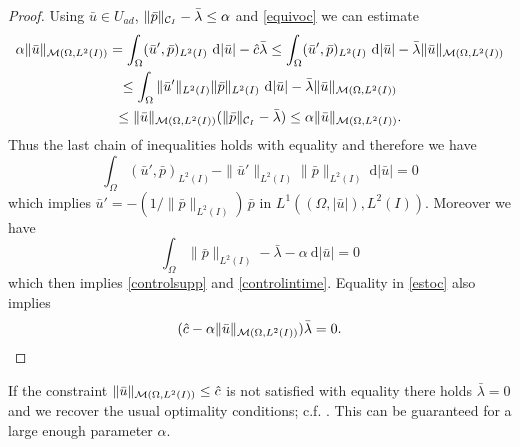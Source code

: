 \begin{proof}
Using $\bar u\in U_{ad}$, $\|\bar p\|_{\mathcal{C}_I}-\bar\lambda\leq\alpha$ and \eqref{equivoc} we can estimate
\begin{multline}\label{estoc}
\alpha\|\bar u\|_{\mathcal{M}(\Omega, L^{2}(I))}=\int_{\Omega}(\bar u',\bar p)_{L^2(I)}~\mathrm d|\bar u|-\hat c\bar\lambda\leq \int_\Omega(\bar u',\bar p)_{L^2(I)}~\mathrm d|\bar u|-\bar\lambda\|\bar u\|_{\mathcal{M}(\Omega, L^{2}(I))}\\
\leq \int_\Omega\|\bar u'\|_{L^2(I)}\|\bar p\|_{L^2(I)}~\mathrm d|\bar u|-\bar\lambda\|\bar u\|_{\mathcal{M}(\Omega, L^{2}(I))}\\
\leq\|\bar u\|_{\mathcal{M}(\Omega, L^{2}(I))}(\|\bar p\|_{\mathcal{C}_I}-\bar\lambda)\leq \alpha\|\bar u\|_{\mathcal{M}(\Omega, L^{2}(I))}.
\end{multline}
Thus the last chain of inequalities holds with equality and therefore we have
\[
\int_{\Omega}(\bar u',\bar p)_{L^2(I)}-\|\bar u'\|_{L^2(I)}\|\bar p\|_{L^2(I)}~\mathrm d|\bar u|=0
\]
which implies $\bar u'=-(1/\|\bar p\|_{L^2(I)})\,\bar p$ in $L^1((\Omega,|\bar u|),L^2(I))$. Moreover we have
\[
\int_\Omega\|\bar p\|_{L^2(I)}-\bar\lambda-\alpha~\mathrm d|\bar u|=0
\] 
which then implies \eqref{controlsupp} and \eqref{controlintime}. Equality in \eqref{estoc} also implies
\[
(\hat c-\alpha\|\bar u\|_{\mathcal{M}(\Omega, L^{2}(I))})\bar\lambda=0.
\]   
\end{proof}
\begin{rmk}
If the constraint $\|\bar u\|_{\mathcal{M}(\Omega, L^{2}(I))}\leq \hat c$ is not satisfied with equality there holds $\bar \lambda=0$ and we recover the usual optimality conditions; c.f. \cite{pieper2014}. This can be guaranteed for a large enough parameter $\alpha$.
\end{rmk}
%


